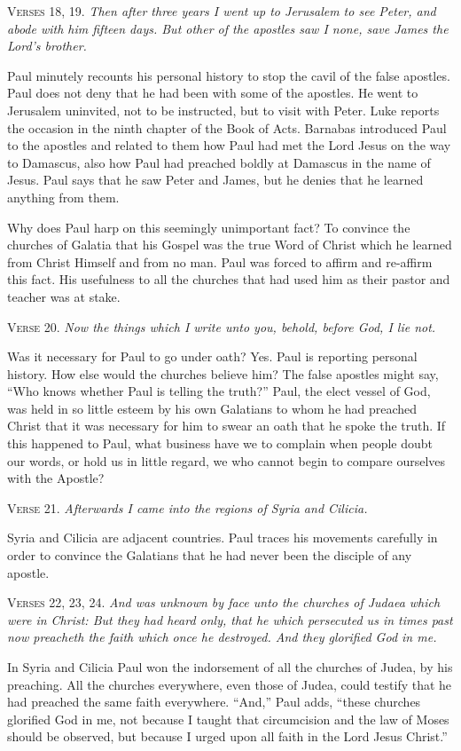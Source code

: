 \textsc{Verses} 18, 19. \emph{Then after three years I went up to Jerusalem to see Peter, and abode with him fifteen days. But other of the apostles saw I none, save James the Lord’s brother.}

Paul minutely recounts his personal history to stop the cavil of the false apostles. Paul does not deny that he had been with some of the apostles. He went to Jerusalem uninvited, not to be instructed, but to visit with Peter. Luke reports the occasion in the ninth chapter of the Book of Acts. Barnabas introduced Paul to the apostles and related to them how Paul had met the Lord Jesus on the way to Damascus, also how Paul had preached boldly at Damascus in the name of Jesus. Paul says that he saw Peter and James, but he denies that he learned anything from them.

Why does Paul harp on this seemingly unimportant fact? To convince the churches of Galatia that his Gospel was the true Word of Christ which he learned from Christ Himself and from no man. Paul was forced to affirm and re-affirm this fact. His usefulness to all the churches that had used him as their pastor and teacher was at stake.

\textsc{Verse} 20. \emph{Now the things which I write unto you, behold, before God, I lie not.}

Was it necessary for Paul to go under oath? Yes. Paul is reporting personal history. How else would the churches believe him? The false apostles might say, “Who knows whether Paul is telling the truth?” Paul, the elect vessel of God, was held in so little esteem by his own Galatians to whom he had preached Christ that it was necessary for him to swear an oath that he spoke the truth. If this happened to Paul, what business have we to complain when people doubt our words, or hold us in little regard, we who cannot begin to compare ourselves with the Apostle?

\textsc{Verse} 21. \emph{Afterwards I came into the regions of Syria and Cilicia.}

Syria and Cilicia are adjacent countries. Paul traces his movements carefully in order to convince the Galatians that he had never been the disciple of any apostle.

\textsc{Verses} 22, 23, 24. \emph{And was unknown by face unto the churches of Judaea which were in Christ: But they had heard only, that he which persecuted us in times past now preacheth the faith which once he destroyed. And they glorified God in me.}

In Syria and Cilicia Paul won the indorsement of all the churches of Judea, by his preaching. All the churches everywhere, even those of Judea, could testify that he had preached the same faith everywhere. “And,” Paul adds, “these churches glorified God in me, not because I taught that circumcision and the law of Moses should be observed, but because I urged upon all faith in the Lord Jesus Christ.”

